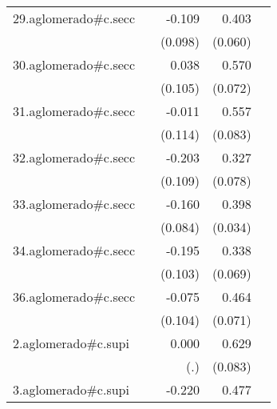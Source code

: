 {\begin{longtable}{l*{4}{D{.}{.}{-1}}}
\addlinespace
29.aglomerado#c.secc&                     &      -0.109         &       0.403\sym{***}&                     \\
            &                     &     (0.098)         &     (0.060)         &                     \\
\addlinespace
30.aglomerado#c.secc&                     &       0.038         &       0.570\sym{***}&                     \\
            &                     &     (0.105)         &     (0.072)         &                     \\
\addlinespace
31.aglomerado#c.secc&                     &      -0.011         &       0.557\sym{***}&                     \\
            &                     &     (0.114)         &     (0.083)         &                     \\
\addlinespace
32.aglomerado#c.secc&                     &      -0.203         &       0.327\sym{***}&                     \\
            &                     &     (0.109)         &     (0.078)         &                     \\
\addlinespace
33.aglomerado#c.secc&                     &      -0.160         &       0.398\sym{***}&                     \\
            &                     &     (0.084)         &     (0.034)         &                     \\
\addlinespace
34.aglomerado#c.secc&                     &      -0.195         &       0.338\sym{***}&                     \\
            &                     &     (0.103)         &     (0.069)         &                     \\
\addlinespace
36.aglomerado#c.secc&                     &      -0.075         &       0.464\sym{***}&                     \\
            &                     &     (0.104)         &     (0.071)         &                     \\
\addlinespace
2.aglomerado#c.supi&                     &       0.000         &       0.629\sym{***}&                     \\
            &                     &         (.)         &     (0.083)         &                     \\
\addlinespace
3.aglomerado#c.supi&                     &      -0.220         &       0.477\sym{***}&                     \\

\end{longtable}}
